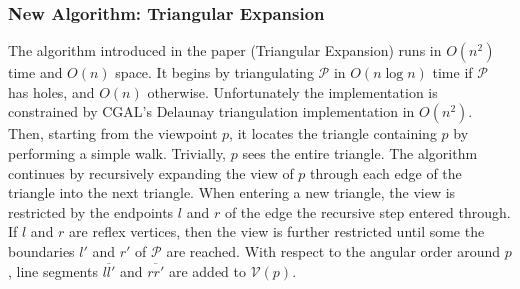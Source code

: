 \subsubsection{New Algorithm: Triangular Expansion}
The algorithm introduced in the paper (Triangular Expansion) runs in $O(n^2)$ time and $O(n)$ space. It begins by triangulating $\mathcal P$ in $O(n \log n)$ time if $\mathcal P$ has holes, and $O(n)$ otherwise. Unfortunately the implementation is constrained by CGAL's Delaunay triangulation implementation in $O(n^2)$. Then, starting from the viewpoint $p$, it locates the triangle containing $p$ by performing a simple walk. Trivially, $p$ sees the entire triangle. The algorithm continues by recursively expanding the view of $p$ through each edge of the triangle into the next triangle. When entering a new triangle, the view is restricted by the endpoints $l$ and $r$ of the edge the recursive step entered through. If $l$ and $r$ are reflex vertices, then the view is further restricted until some the boundaries $l'$ and $r'$ of $\mathcal P$ are reached. With respect to the angular order around $p$, line segments $\overline{ll'}$ and $\overline{rr'}$ are added to $\mathcal V(p)$.

